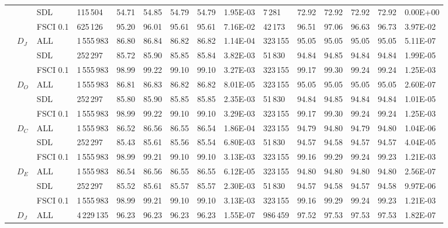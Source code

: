 \begin{table*}[h]
\begin{tabular}{|lllllllllllllll|}
 & & SDL & 115\,504 & 54.71  & 54.85  & 54.79 & 54.79   & 1.95E-03 & 7\,281   & 72.92  & 72.92  & 72.92 & 72.92   & 0.00E+00    \\
 & & FSCI 0.1   & 625\,126  & 95.20  & 96.01  & 95.61 & 95.61   & 7.16E-02  & 42\,173  & 96.51  & 97.06  & 96.63 & 96.73   & 3.97E-02    \\
\hline
\multirow{12}{*}{\UTIL{}}  & \multirow{3}{*}{$D_J$}   & ALL& 1\,555\,983 & 86.80  & 86.84  & 86.82 & 86.82   & 1.14E-04  &323\,155  & 95.05  & 95.05  & 95.05 & 95.05   & 5.11E-07    \\
 & & SDL& 252\,297  & 85.72  & 85.90  & 85.85 & 85.84   & 3.82E-03  & 51\,830 & 94.84  & 94.85  & 94.84 & 94.84   & 1.99E-05    \\
 & & FSCI 0.1  & 1\,555\,983  & 98.99  & 99.22  & 99.10 & 99.10   & 3.27E-03  &323\,155  & 99.17  & 99.30  & 99.24 & 99.24   & 1.25E-03    \\
 & \multirow{3}{*}{$D_O$}    & ALL& 1\,555\,983 & 86.81  & 86.83  & 86.82 & 86.82   & 8.01E-05   &323\,155 & 95.05  & 95.05  & 95.05 & 95.05   & 2.60E-07    \\
 & & SDL & 252\,297 & 85.80  & 85.90  & 85.85 & 85.85   & 2.35E-03 & 51\,830  & 94.84  & 94.85  & 94.84 & 94.84   & 1.01E-05    \\
 & & FSCI 0.1  & 1\,555\,983  & 98.99  & 99.22  & 99.10 & 99.10   & 3.29E-03  &323\,155  & 99.17  & 99.30  & 99.24 & 99.24   & 1.25E-03    \\
 & \multirow{3}{*}{$D_C$}    & ALL& 1\,555\,983 & 86.52  & 86.56  & 86.55 & 86.54   & 1.86E-04  &323\,155  & 94.79  & 94.80  & 94.79 & 94.80   & 1.04E-06    \\
 & & SDL & 252\,297 & 85.43  & 85.61  & 85.56 & 85.54   & 6.80E-03  & 51\,830 & 94.57  & 94.58  & 94.57 & 94.57   & 4.04E-05    \\
 & & FSCI 0.1   & 1\,555\,983 & 98.99  & 99.21  & 99.10 & 99.10   & 3.13E-03  &323\,155  & 99.16  & 99.29  & 99.24 & 99.23   & 1.21E-03    \\
 & \multirow{3}{*}{$D_E$} & ALL& 1\,555\,983 & 86.54  & 86.56  & 86.55 & 86.55   & 6.12E-05  &323\,155  & 94.80  & 94.80  & 94.80 & 94.80   & 2.56E-07    \\
 & & SDL & 252\,297 & 85.52  & 85.61  & 85.57 & 85.57   & 2.30E-03 & 51\,830  & 94.57  & 94.58  & 94.57 & 94.58   & 9.97E-06    \\
 & & FSCI 0.1   & 1\,555\,983 & 98.99  & 99.21  & 99.10 & 99.10   & 3.13E-03  &323\,155  & 99.16  & 99.29  & 99.24 & 99.23   & 1.21E-03    \\
\hline
\multirow{12}{*}{\MLFS{}{}} & \multirow{3}{*}{$D_J$}   & ALL & 4\,229\,135& 96.23  & 96.23  & 96.23 & 96.23   & 1.55E-07 & 986\,459   & 97.52  & 97.53  & 97.53 & 97.53   & 1.82E-07    \\

\end{tabular}
\end{table*}
